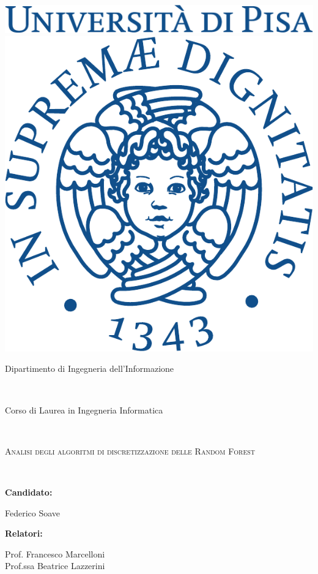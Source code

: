 \documentclass[a4paper,11pt,twoside,openright,fleqn]{book}
\begin{document}
\begin{titlepage}
\centering

\includegraphics[scale=0.25]{img/unipi.pdf}
\\[0.8cm]
\includegraphics[scale=0.4]{img/cherubino.pdf}
\\[1.5cm]
\begin{large} \sc Dipartimento di Ingegneria dell'Informazione \end{large}
\\[0.3cm]
\begin{large} \sc Corso di Laurea in Ingegneria Informatica \end{large}
\\[3.5cm]
{\Huge\textsc{Analisi degli algoritmi di discretizzazione delle Random Forest} \par}~
\\[3.5cm]
\begin{minipage}{0.45\textwidth}\raggedright
\begin{large} \textbf{Candidato:}\\[0.3cm] \end{large}
Federico Soave
\end{minipage}
\begin{minipage}{0.45\textwidth}\raggedleft
\begin{large} \textbf{Relatori:}\\[0.3cm] \end{large}
Prof. Francesco Marcelloni\\[0.1cm]
Prof.ssa Beatrice Lazzerini
\end{minipage}


\end{titlepage}
\end{document}
